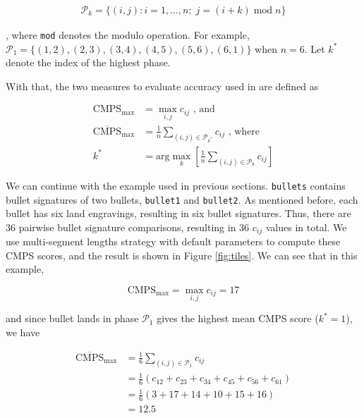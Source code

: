 \begin{align}
\mathcal{P}_k = \{ \left(i,j\right): i = 1, \dots, n ; \; j = \left(i + k\right) \;\mathrm{mod}\; n \}
\end{align}

, where \texttt{mod} denotes the modulo operation. For example,
\(\mathcal{P}_1 = \{ \left(1,2\right), \left(2,3\right), \left(3,4\right), \left(4,5\right), \left(5,6\right), \left(6,1\right) \}\)
when \(n = 6\). Let \(k^*\) denote the index of the highest phase.

With that, the two measures to evaluate accuracy used in \citet{cmps}
are defined as

\begin{align}
\mathrm{CMPS_{max}} &= \max_{i,j} c_{ij} \text{ , and} \\
\mathrm{\overline{CMPS}_{max}} &= \frac{1}{n} \sum_{(i,j) \in \mathcal{P}_{k^*}} c_{ij} \text{ , where} \\
k^* &= \text{arg}\max\limits_{k} \left[  \frac{1}{n} \sum_{(i,j) \in \mathcal{P}_k} c_{ij}\right]
\end{align}

We can continue with the example used in previous sections.
\texttt{bullets} contains bullet signatures of two bullets,
\texttt{bullet1} and \texttt{bullet2}. As mentioned before, each bullet
has six land engravings, resulting in six bullet signatures. Thus, there
are 36 pairwise bullet signature comparisons, resulting in 36 \(c_{ij}\)
values in total. We use multi-segment lengths strategy with default
parameters to compute these CMPS scores, and the result is shown in
Figure \ref{fig:tiles}. We can see that in this example,

\[
\mathrm{CMPS_{max}} =  \max_{i,j} c_{ij} = 17
\]

and since bullet lands in phase \(\mathcal{P}_1\) gives the highest mean
CMPS score (\(k^* = 1\)), we have

\[
\begin{aligned}
\mathrm{\overline{CMPS}_{max}} &= \frac{1}{6} \sum_{(i,j) \in \mathcal{P}_1} c_{ij} \\
                        &= \frac{1}{6} \left(c_{12} + c_{23} + c_{34} + c_{45} + c_{56} + c_{61}\right) \\
                        &= \frac{1}{6} \left(3+17+14+10+15+16\right) \\
                        &= 12.5
\end{aligned}
\]


